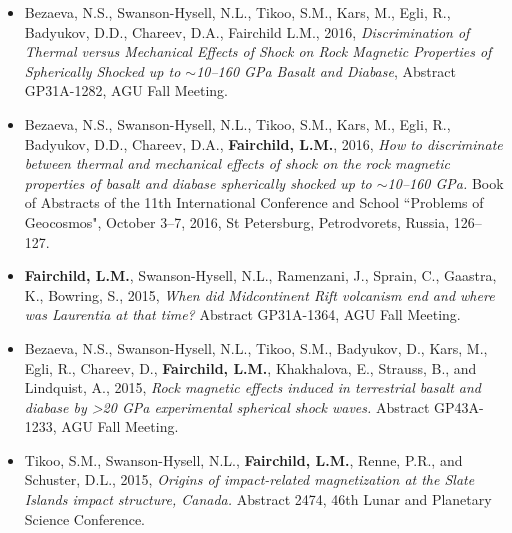 \documentclass[11pt,a4paper,sans]{moderncv}        %
\begin{document}
\begin{itemize}
\vspace{3pt}

\item{Bezaeva, N.S., Swanson-Hysell, N.L., Tikoo, S.M., Kars, M., Egli, R., Badyukov, D.D., Chareev, D.A., Fairchild L.M., 2016, \textit{Discrimination of Thermal versus Mechanical Effects of Shock on Rock Magnetic Properties of Spherically Shocked up to $\sim$10--160 GPa Basalt and Diabase}, Abstract GP31A-1282, AGU Fall Meeting.}

\vspace{3pt}

\item{Bezaeva, N.S., Swanson-Hysell, N.L., Tikoo, S.M., Kars, M., Egli, R., Badyukov, D.D., Chareev, D.A., \textbf{Fairchild, L.M.}, 2016, \textit{How to discriminate between thermal and mechanical effects of shock on the rock magnetic properties of basalt and diabase spherically shocked up to $\sim$10--160 GPa.} Book of Abstracts of the 11th International Conference and School ``Problems of Geocosmos", October 3--7, 2016, St Petersburg, Petrodvorets, Russia, 126--127.}

\vspace{3pt}

\item{\textbf{Fairchild, L.M.}, Swanson-Hysell, N.L., Ramenzani, J., Sprain, C., Gaastra, K., Bowring, S., 2015, \textit{When did Midcontinent Rift volcanism end and where was Laurentia at that time?} Abstract GP31A-1364, AGU Fall Meeting.}


\vspace{3pt}

\item{Bezaeva, N.S., Swanson-Hysell, N.L., Tikoo, S.M., Badyukov, D., Kars, M., Egli, R., Chareev, D., \textbf{Fairchild, L.M.}, Khakhalova, E., Strauss, B., and Lindquist, A., 2015, \textit{Rock magnetic effects induced in terrestrial basalt and diabase by >20 GPa experimental spherical shock waves.} Abstract GP43A-1233, AGU Fall Meeting.}

\vspace{3pt}

\item{Tikoo, S.M., Swanson-Hysell, N.L., \textbf{Fairchild, L.M.}, Renne, P.R., and Schuster, D.L., 2015, \textit{Origins of impact-related magnetization at the Slate Islands impact structure, Canada.} Abstract 2474, 46th Lunar and Planetary Science Conference.}

\vspace{3pt}


\end{itemize}
\end{document}
